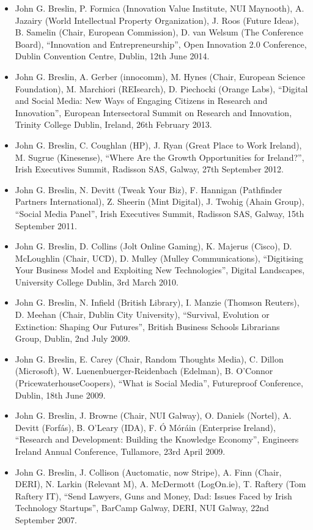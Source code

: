 \documentclass[10pt,a4paper]{res} %
\begin{document}
\begin{resume}
\begin{itemize}
\item John G. Breslin, P. Formica (Innovation Value Institute, NUI Maynooth), A. Jazairy (World Intellectual Property Organization), J. Roos (Future Ideas), B. Samelin (Chair, European Commission), D. van Welsum (The Conference Board), ``Innovation and Entrepreneurship'', Open Innovation 2.0 Conference, Dublin Convention Centre, Dublin, 12th June 2014.
\item John G. Breslin, A. Gerber (innocomm), M. Hynes (Chair, European Science Foundation), M. Marchiori (REIsearch), D. Piechocki (Orange Labs), ``Digital and Social Media: New Ways of Engaging Citizens in Research and Innovation'', European Intersectoral Summit on Research and Innovation, Trinity College Dublin, Ireland, 26th February 2013.
\item John G. Breslin, C. Coughlan (HP), J. Ryan (Great Place to Work Ireland), M. Sugrue (Kinesense), ``Where Are the Growth Opportunities for Ireland?'', Irish Executives Summit, Radisson SAS, Galway, 27th September 2012.
\item John G. Breslin, N. Devitt (Tweak Your Biz), F. Hannigan (Pathfinder Partners International), Z. Sheerin (Mint Digital), J. Twohig (Ahain Group), ``Social Media Panel'', Irish Executives Summit, Radisson SAS, Galway, 15th September 2011.
\item John G. Breslin, D. Collins (Jolt Online Gaming), K. Majerus (Cisco), D. McLoughlin (Chair, UCD), D. Mulley (Mulley Communications), ``Digitising Your Business Model and Exploiting New Technologies'', Digital Landscapes, University College Dublin, 3rd March 2010.
\item John G. Breslin, N. Infield (British Library), I. Manzie (Thomson Reuters), D. Meehan (Chair, Dublin City University), ``Survival, Evolution or Extinction: Shaping Our Futures'', British Business Schools Librarians Group, Dublin, 2nd July 2009.
\item John G. Breslin, E. Carey (Chair, Random Thoughts Media), C. Dillon (Microsoft), W. Luenenbuerger-Reidenbach (Edelman), B. O'Connor (PricewaterhouseCoopers), ``What is Social Media'', Futureproof Conference, Dublin, 18th June 2009.
\item John G. Breslin, J. Browne (Chair, NUI Galway), O. Daniels (Nortel), A. Devitt (Forf\'{a}s), B. O'Leary (IDA), F. \'{O} M\'{o}r\'{a}in (Enterprise Ireland), ``Research and Development: Building the Knowledge Economy'', Engineers Ireland Annual Conference, Tullamore, 23rd April 2009.
\item John G. Breslin, J. Collison (Auctomatic, now Stripe), A. Finn (Chair, DERI), N. Larkin (Relevant M), A. McDermott (LogOn.ie), T. Raftery (Tom Raftery IT), ``Send Lawyers, Guns and Money, Dad: Issues Faced by Irish Technology Startups'', BarCamp Galway, DERI, NUI Galway, 22nd September 2007.

\end{itemize}
\end{resume}
\end{document}
